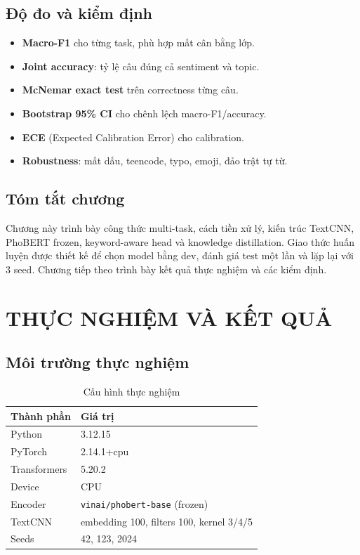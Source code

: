 \documentclass[12pt,a4paper]{report}
\begin{document}
\section{Độ đo và kiểm định}

\begin{itemize}[leftmargin=1.2cm]
  \item \textbf{Macro-F1} cho từng task, phù hợp mất cân bằng lớp.
  \item \textbf{Joint accuracy}: tỷ lệ câu đúng cả sentiment và topic.
  \item \textbf{McNemar exact test} trên correctness từng câu.
  \item \textbf{Bootstrap 95\% CI} cho chênh lệch macro-F1/accuracy.
  \item \textbf{ECE} (Expected Calibration Error) cho calibration.
  \item \textbf{Robustness}: mất dấu, teencode, typo, emoji, đảo trật tự từ.
\end{itemize}


\section*{Tóm tắt chương}
Chương này trình bày công thức multi-task, cách tiền xử lý, kiến trúc TextCNN, PhoBERT frozen, keyword-aware head và knowledge distillation. Giao thức huấn luyện được thiết kế để chọn model bằng dev, đánh giá test một lần và lặp lại với 3 seed. Chương tiếp theo trình bày kết quả thực nghiệm và các kiểm định.


\chapter{THỰC NGHIỆM VÀ KẾT QUẢ}

\section{Môi trường thực nghiệm}

\begin{table}[H]
\centering
\caption{Cấu hình thực nghiệm}
\begin{tabular}{@{}ll@{}}
\toprule
\textbf{Thành phần} & \textbf{Giá trị} \\
\midrule
Python & 3.12.15 \\
PyTorch & 2.14.1+cpu \\
Transformers & 5.20.2 \\
Device & CPU \\
Encoder & \texttt{vinai/phobert-base} (frozen) \\
TextCNN & embedding 100, filters 100, kernel 3/4/5 \\
Seeds & 42, 123, 2024 \\
\bottomrule
\end{tabular}
\end{table}
\end{document}
